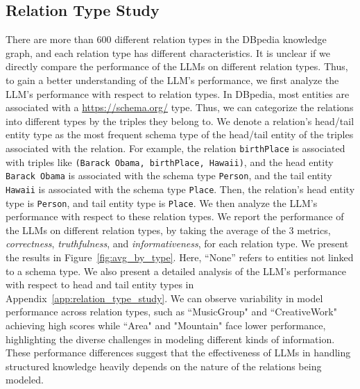 \vspace{-2mm}
\subsection{Relation Type Study}

 

\label{exp:relation_type_study} 
There are more than 600 different relation types in the DBpedia knowledge graph, and each relation type has different characteristics. It is unclear if we directly compare the performance of the LLMs on different relation types.
Thus, to gain a better understanding of the LLM's performance, we first analyze the LLM's performance with respect to relation types. In DBpedia, most entities are associated with a \url{https://schema.org/} type. Thus, we can categorize the relations into different types by the triples they belong to. We denote a relation's head/tail entity type as the most frequent schema type of the head/tail entity of the triples associated with the relation.
 For example, the relation \texttt{birthPlace} is associated with triples like \texttt{(Barack Obama, birthPlace, Hawaii)}, and the head entity \texttt{Barack Obama} is associated with the schema type \texttt{Person}, and the tail entity \texttt{Hawaii} is associated with the schema type \texttt{Place}. Then, the relation's head entity type is \texttt{Person}, and tail entity type is \texttt{Place}.
 We then analyze the LLM's performance with respect to these relation types. We report the performance of the LLMs on different relation types, by taking the average of the 3 metrics, \textit{correctness}, \textit{truthfulness}, and \textit{informativeness}, for each relation type. We present the results in Figure~\ref{fig:avg_by_type}. Here, ``None'' refers to entities not linked to a schema type. We also present a detailed analysis of the LLM's performance with respect to head and tail entity types in Appendix~\ref{app:relation_type_study}.
We can observe variability in model performance across relation types, such as ``MusicGroup" and ``CreativeWork" achieving high scores while ``Area" and "Mountain" face lower performance, highlighting the diverse challenges in modeling different kinds of information. These performance differences suggest that the effectiveness of LLMs in handling structured knowledge heavily depends on the nature of the relations being modeled.
